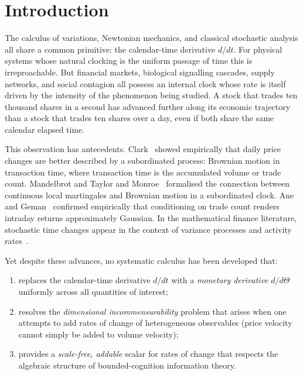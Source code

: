 \documentclass[twocolumn,11pt,a4paper]{article}
\theoremstyle{thmstyle}
\theoremstyle{definition}
\theoremstyle{remark}
\newcommand{\Clock}{\Theta}                  %
\begin{document}
\vspace{6pt}
\tableofcontents
\vspace{6pt}


\section{Introduction}
\label{sec:intro}

The calculus of variations, Newtonian mechanics, and
classical stochastic analysis all share a common
primitive: the calendar-time derivative $d/dt$.  For
physical systems whose natural clocking is the uniform
passage of time this is irreproachable.  But financial
markets, biological signalling cascades, supply networks,
and social contagion all possess an internal clock whose
rate is itself driven by the intensity of the phenomenon
being studied.  A stock that trades ten thousand shares in
a second has advanced further along its economic trajectory
than a stock that trades ten shares over a day, even if
both share the same calendar elapsed time.

This observation has antecedents.  Clark~\citep{Clark1973}
showed empirically that daily price changes are better
described by a subordinated process: Brownian motion in
transaction time, where transaction time is the
accumulated volume or trade count.  Mandelbrot and Taylor
\citep{MandelbrotTaylor1967} and
Monroe~\citep{Monroe1978} formalised the connection between
continuous local martingales and Brownian motion in a
subordinated clock.  Ane and Geman~\citep{AneGeman2000}
confirmed empirically that conditioning on trade count
renders intraday returns approximately Gaussian.
In the mathematical finance literature, stochastic time
changes appear in the context of variance processes and
activity rates~\citep{BarndorffNielsenShephard2001}.

Yet despite these advances, no systematic calculus has been
developed that:
\begin{enumerate}[nosep]
\item replaces the calendar-time derivative $d/dt$ with a
      \emph{monetary derivative} $d/d\Clock$ uniformly
      across all quantities of interest;
\item resolves the \emph{dimensional incommensurability}
      problem that arises when one attempts to add rates of
      change of heterogeneous observables (price velocity
      cannot simply be added to volume velocity);
\item provides a \emph{scale-free, addable} scalar for
      rates of change that respects the algebraic structure
      of bounded-cognition information theory.
\end{enumerate}
\end{document}
